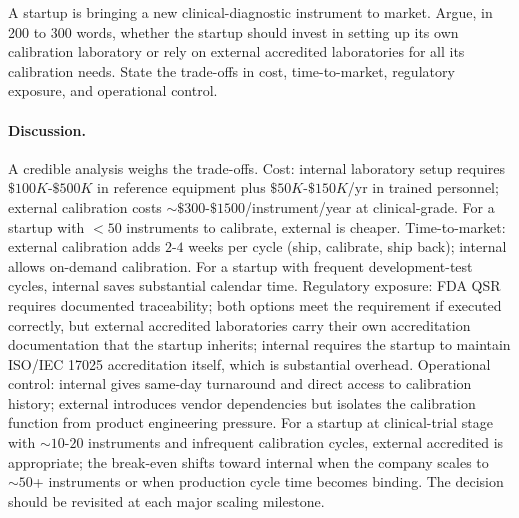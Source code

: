 \begin{exercise}
A startup is bringing a new clinical-diagnostic instrument to
market. Argue, in 200 to 300 words, whether the startup should
invest in setting up its own calibration laboratory or rely on
external accredited laboratories for all its calibration needs.
State the trade-offs in cost, time-to-market, regulatory exposure,
and operational control.

\paragraph{Discussion.} A credible analysis weighs the trade-offs.
Cost: internal laboratory setup requires $\$100K$-$\$500K$ in
reference equipment plus $\$50K$-$\$150K$/yr in trained personnel;
external calibration costs $\sim \$300$-$\$1500$/instrument/year at
clinical-grade. For a startup with $< 50$ instruments to calibrate,
external is cheaper. Time-to-market: external calibration adds
$2$-$4$ weeks per cycle (ship, calibrate, ship back); internal
allows on-demand calibration. For a startup with frequent
development-test cycles, internal saves substantial calendar time.
Regulatory exposure: FDA QSR requires documented traceability;
both options meet the requirement if executed correctly, but
external accredited laboratories carry their own accreditation
documentation that the startup inherits; internal requires the
startup to maintain ISO/IEC 17025 accreditation itself, which is
substantial overhead. Operational control: internal gives same-day
turnaround and direct access to calibration history; external
introduces vendor dependencies but isolates the calibration
function from product engineering pressure. For a startup at
clinical-trial stage with $\sim 10$-$20$ instruments and infrequent
calibration cycles, external accredited is appropriate; the
break-even shifts toward internal when the company scales to
$\sim 50$+ instruments or when production cycle time becomes
binding. The decision should be revisited at each major scaling
milestone.
\end{exercise}
